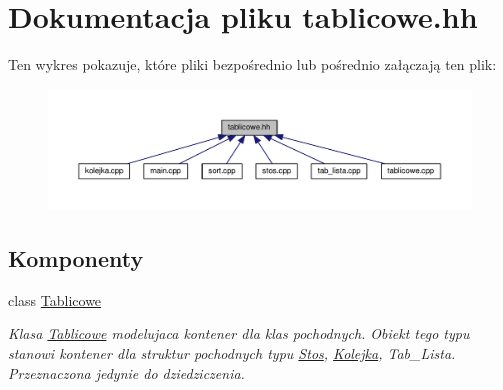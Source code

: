 \hypertarget{tablicowe_8hh}{\section{Dokumentacja pliku tablicowe.\-hh}
\label{tablicowe_8hh}
}
Ten wykres pokazuje, które pliki bezpośrednio lub pośrednio załączają ten plik\-:\nopagebreak
\begin{figure}[H]
\begin{center}
\leavevmode
\includegraphics[width=350pt]{tablicowe_8hh__dep__incl}
\end{center}
\end{figure}
\subsection*{Komponenty}
\begin{DoxyCompactItemize}
\item 
class \hyperlink{class_tablicowe}{Tablicowe}
\begin{DoxyCompactList}\small\item\em Klasa \hyperlink{class_tablicowe}{Tablicowe} modelujaca kontener dla klas pochodnych. Obiekt tego typu stanowi kontener dla struktur pochodnych typu \hyperlink{struct_stos}{Stos}, \hyperlink{class_kolejka}{Kolejka}, Tab\-\_\-\-Lista. Przeznaczona jedynie do dziedziczenia. \end{DoxyCompactList}\end{DoxyCompactItemize}

